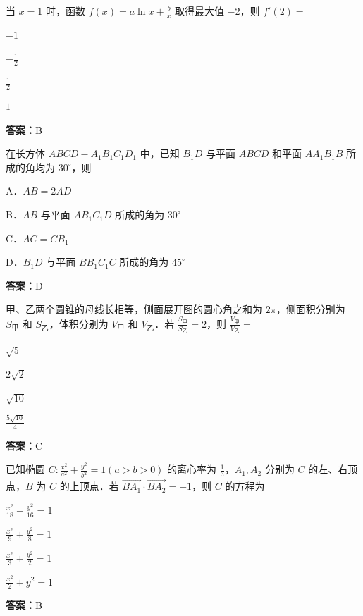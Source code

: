 \begin{question}[points=5]
当 $x=1$ 时，函数 $f(x)=a\ln x+\frac{b}{x}$ 取得最大值 $-2$，则 $f'(2)=$
\begin{choices}
  \item $-1$
  \item $-\frac{1}{2}$
  \item $\frac{1}{2}$
  \item $1$
\end{choices}
\begin{solution}
\textbf{答案：}B
\end{solution}
\end{question}

\begin{question}[points=5]
在长方体 $ABCD-A_1B_1C_1D_1$ 中，已知 $B_1D$ 与平面 $ABCD$ 和平面 $AA_1B_1B$ 所成的角均为 $30^\circ$，则
\begin{choices}
  \item A．$AB=2AD$
  \item B．$AB$ 与平面 $AB_1C_1D$ 所成的角为 $30^\circ$
  \item C．$AC=CB_1$
  \item D．$B_1D$ 与平面 $BB_1C_1C$ 所成的角为 $45^\circ$
\end{choices}
\begin{solution}
\textbf{答案：}D
\end{solution}
\end{question}

\begin{question}[points=5]
甲、乙两个圆锥的母线长相等，侧面展开图的圆心角之和为 $2\pi$，侧面积分别为 $S_{\text{甲}}$ 和 $S_{\text{乙}}$，体积分别为 $V_{\text{甲}}$ 和 $V_{\text{乙}}$．若 $\frac{S_{\text{甲}}}{S_{\text{乙}}}=2$，则 $\frac{V_{\text{甲}}}{V_{\text{乙}}}=$
\begin{choices}
  \item $\sqrt{5}$
  \item $2\sqrt{2}$
  \item $\sqrt{10}$
  \item $\frac{5\sqrt{10}}{4}$
\end{choices}
\begin{solution}
\textbf{答案：}C
\end{solution}
\end{question}

\begin{question}[points=5]
已知椭圆 $C:\frac{x^2}{a^2}+\frac{y^2}{b^2}=1(a>b>0)$ 的离心率为 $\frac{1}{3}$，$A_1,A_2$ 分别为 $C$ 的左、右顶点，$B$ 为 $C$ 的上顶点．若 $\overrightarrow{BA_1}\cdot\overrightarrow{BA_2}=-1$，则 $C$ 的方程为
\begin{choices}
  \item $\frac{x^2}{18}+\frac{y^2}{16}=1$
  \item $\frac{x^2}{9}+\frac{y^2}{8}=1$
  \item $\frac{x^2}{3}+\frac{y^2}{2}=1$
  \item $\frac{x^2}{2}+y^2=1$
\end{choices}
\begin{solution}
\textbf{答案：}B
\end{solution}
\end{question}

